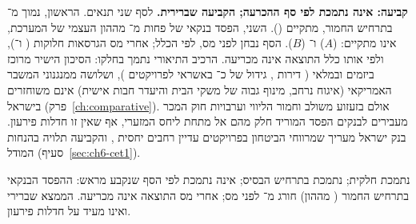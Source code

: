 \textbf{קביעה: אינה נתמכת לפי סף ההכרעה; הקביעה שברירית.} לסף \mbox{} שני תנאים. הראשון,  נמוך מ־ בתרחיש החמור, מתקיים (). השני, הפסד בנקאי של פחות מ־ מההון העצמי של המערכת, אינו מתקיים:  ($A$) ו־ ($B$). הסף נבחן לפני מס, לפי הכלל; אחרי מס הגרסאות חלוקות ( ו־), ולפי אותו כלל התוצאה אינה מכריעה. הרכיב התיאורי נתמך בחלקו: הסיכון הישיר מרוכז ביזמים ובמלאי ( דירות \cite{cbs_newdwellings_2026q3}, גידול של כ־ באשראי לפרויקטים \cite{boi2026_recredit}), ושלושה ממנגנוני המשבר האמריקאי (איגוח נרחב, מינוף גבוה של משקי הבית והיעדר חבות אישית) אינם משוחזרים בישראל (פרק~\ref{ch:comparative}). אולם בזעזוע משולב וחמור הליווי וערבויות חוק המכר מעבירים לבנקים הפסד המוריד חלק מהם אל מתחת ליחס המזערי, אף שאין זו חדלות פירעון. בנק ישראל מעריך שמרווחי הביטחון בפרויקטים עדיין רחבים יחסית \cite{boi2026_recredit}, והקביעה תלויה בהנחות המודל (סעיף~\ref{sec:ch6-cet1}).

\begin{keyfinding}
 נתמכת חלקית;  נתמכת בתרחיש הבסיס;  אינה נתמכת לפי הסף שנקבע מראש: ההפסד הבנקאי בתרחיש החמור ( מההון) חורג מ־ לפני מס; אחרי מס התוצאה אינה מכריעה. הממצא שברירי ואינו מעיד על חדלות פירעון.
\end{keyfinding}

